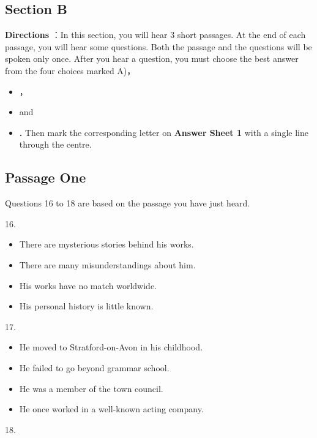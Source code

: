 \documentclass[UTF8,11pt]{ctexart}
\begin{document}
\subsection*{Section B}


\textbf{Directions} ：In this section, you will hear 3 short passages. At the end of each passage, you will hear some questions. Both the passage and the questions will be spoken only once. After you hear a question, you must choose the best answer from the four choices marked A)，


\begin{itemize}[leftmargin=2em,itemsep=.2em,topsep=.4em]\item[B.] ，
\item[C.] and
\item[D.] \textbf{.} Then mark the corresponding letter on \textbf{Answer Sheet 1} with a single line through the centre.
\end{itemize}

\subsection*{Passage One}


Questions 16 to 18 are based on the passage you have just heard.


16.


\begin{itemize}[leftmargin=2em,itemsep=.2em,topsep=.4em]\item[A.] There are mysterious stories behind his works.
\item[B.] There are many misunderstandings about him.
\item[C.] His works have no match worldwide.
\item[D.] His personal history is little known.
\end{itemize}

17.


\begin{itemize}[leftmargin=2em,itemsep=.2em,topsep=.4em]\item[A.] He moved to Stratford-on-Avon in his childhood.
\item[B.] He failed to go beyond grammar school.
\item[C.] He was a member of the town council.
\item[D.] He once worked in a well-known acting company.
\end{itemize}

18.
\end{document}

